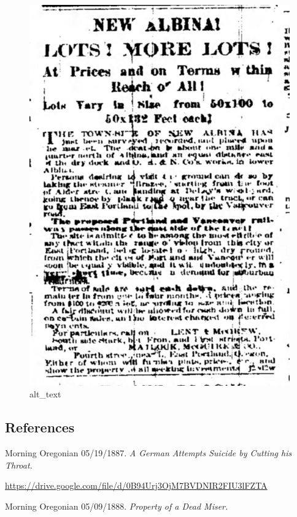 \documentclass[
  12pt,
]{book}
\begin{document}
\begin{figure}
\centering
\includegraphics{images/0204a_images/image5.jpg}
\caption{alt\_text}
\end{figure}

\hypertarget{references-6}{%
\subsection{References}\label{references-6}}

Morning Oregonian 05/19/1887. \emph{A German Attempts Suicide by Cutting his Throat.}

\href{https://drive.google.com/file/d/0B94Urj3OjM7BVDNIR2FIU3lFZTA/view}{https://drive.google.com/file/d/0B94Urj3OjM7BVDNIR2FIU3lFZTA}

Morning Oregonian 05/09/1888. \emph{Property of a Dead Miser.}
\end{document}
